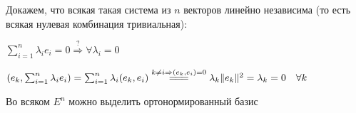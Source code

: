 \documentclass[12pt]{article}
\begin{document}
    \Nota Докажем, что всякая такая система из $n$ векторов линейно независима (то есть всякая нулевая комбинация тривиальная):

    $\sum_{i=1}^n \lambda_i e_i = 0 \stackrel{?}{\Longrightarrow} \forall \lambda_i = 0$

    $\left(e_k, \sum_{i=1}^n \lambda_i e_i\right) = \sum_{i=1}^n \lambda_i (e_k, e_i) \stackrel{k \neq i \Rightarrow (e_k, e_i) = 0}{=\joinrel=\joinrel=}
    \lambda_k \|e_k\|^2 = \lambda_k = 0 \quad \forall k$


    \hypertarget{orthogonalbasisinspace}{}

    \begin{MyTheorem}
        \Ths Во всяком $E^n$ можно выделить ортонормированный базис
    \end{MyTheorem}
\end{document}
